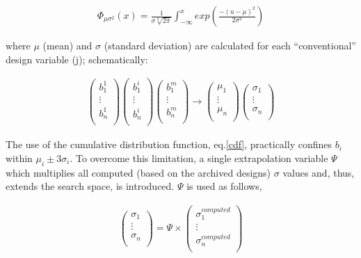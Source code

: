 \begin{eqnarray}
   \Phi _{\mu \sigma ^2} (x)= \frac{1}{\sigma\sqrt[2]{2\pi}}\int _{-\infty}^x exp(\frac{-(u-\mu)^2}{2 \sigma^2}) 
   \label{cdf} 
\end{eqnarray}

where $\mu$ (mean) and $\sigma$ (standard deviation) are calculated for each “conventional” design variable (j); schematically:

\begin{eqnarray}
		\left( {\begin{array}{c}
 		b_1^1  \\
 		\vdots  \\
 		b_n^1	\\
 		\end{array} } \right) 
 		\left( {\begin{array}{c}
 		b_1^i  \\
 		\vdots  \\
 		b_n^i	\\
 		\end{array} } \right)
 		\left( {\begin{array}{c}
 		b_1^m  \\
 		\vdots  \\
 		b_n^m	\\
 		\end{array} } \right) \rightarrow
		\left( {\begin{array}{c}
 		\mu _1  \\
 		\vdots  \\
 		\mu _n  \\
 		\end{array} } \right)
		\left( {\begin{array}{c}
 		\sigma _1  \\
 		\vdots  \\
 		\sigma _n  \\
 		\end{array} } \right)
   \label{cdf-matrix} 
\end{eqnarray}

The use of the cumulative distribution function, eq.\ref{cdf}, practically confines $b_i$ within $\mu _i \pm 3\sigma _i$. To overcome this limitation, a single extrapolation variable $\Psi$ which multiplies all computed (based on the archived designs) $\sigma$ values and, thus, extends the search space, is introduced. $\Psi$ is used as follows,


\begin{eqnarray}
		\left( {\begin{array}{c}
 		\sigma _1  \\
 		\vdots  \\
 		\sigma _n  \\
 		\end{array} } \right) =
 		\Psi \times 
 		\left( {\begin{array}{c}
 		\sigma _1^{computed}  \\
 		\vdots  \\
 		\sigma _n^{computed}  \\
 		\end{array} } \right)
   \label{cdf-matrix} 
\end{eqnarray}

